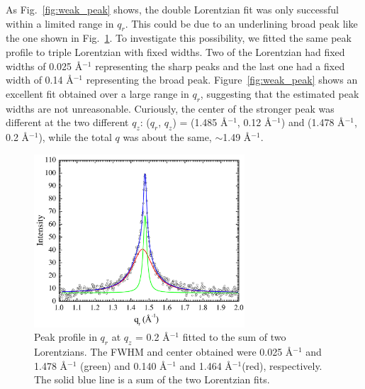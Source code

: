 As Fig.~\ref{fig:weak_peak}
shows, the double Lorentzian fit was only successful within a limited range
in $q_r$. This could be due to an underlining broad peak like the one
shown in Fig.~\ref{fig:strong_peak}. To investigate this possibility,
we fitted the same peak profile to triple Lorentzian with fixed widths.
Two of the Lorentzian had fixed widths of 0.025 \AA$^{-1}$ representing 
the sharp peaks and the last one had a fixed width of 0.14 \AA$^{-1}$
representing the broad peak. Figure~\ref{fig:weak_peak} shows an excellent
fit obtained over a large range in $q_r$, suggesting that the estimated
peak widths are not unreasonable.
Curiously, the center of the stronger peak was different at the two 
different $q_z$: ($q_r$, $q_z$) = (1.485 \AA$^{-1}$, 0.12 \AA$^{-1}$)
and (1.478 \AA$^{-1}$, 0.2 \AA$^{-1}$), while the total $q$ was about
the same, $\sim$1.49 \AA$^{-1}$.

\begin{figure}[htbp]
  \centering
  \includegraphics[width=0.7\textwidth]{figures/ripple/nGIWAXS/strong_peak_Lorentz}
  \caption[Peak profile in $q_r$ at $q_z$ = 0.2 \AA$^{-1}$ 
  fitted to the sum of two Lorentzians]
  {Peak profile in $q_r$ at $q_z$ = 0.2 \AA$^{-1}$ 
  fitted to the sum of two Lorentzians. The FWHM and center obtained 
  were 0.025 \AA$^{-1}$ and 1.478 \AA$^{-1}$ (green) and 0.140 \AA$^{-1}$ 
  and 1.464 \AA$^{-1}$(red), respectively. The solid blue line is a sum
  of the two Lorentzian fits.}
  \label{fig:strong_peak}
\end{figure}

